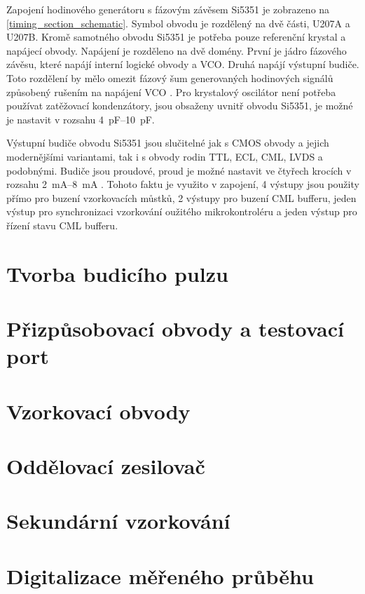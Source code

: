 Zapojení hodinového generátoru s fázovým závěsem Si5351 je zobrazeno na \ref{timing_section_schematic}. Symbol obvodu je rozdělený na dvě části, U207A a U207B. Kromě samotného obvodu Si5351 je potřeba pouze referenční krystal a napájecí obvody. Napájení je rozděleno na dvě domény. První je jádro fázového závěsu, které napájí interní logické obvody a \acrshort{VCO}. Druhá napájí výstupní budiče. Toto rozdělení by mělo omezit fázový šum generovaných hodinových signálů způsobený rušením na napájení \acrshort{VCO} \cite{Si5351applicationnote}. Pro krystalový oscilátor není potřeba používat zatěžovací kondenzátory, jsou obsaženy uvnitř obvodu Si5351, je možné je nastavit v rozsahu \SIrange{4}{10}{\si{pF}}.

Výstupní budiče obvodu Si5351 jsou slučitelné jak s \acrshort{CMOS} obvody a jejich modernějšími variantami, tak i s obvody rodin \acrshort{TTL}, \acrshort{ECL}, \acrshort{CML}, \acrshort{LVDS} a podobnými. Budiče jsou proudové, proud je možné nastavit ve čtyřech krocích v rozsahu \SIrange{2}{8}{\si{mA}} \cite{Si5351datasheet}. Tohoto faktu je využito v zapojení, 4 výstupy jsou použity přímo pro buzení vzorkovacích můstků, 2 výstupy pro buzení \acrshort{CML} bufferu, jeden výstup pro synchronizaci vzorkování oužitého mikrokontroléru a jeden výstup pro řízení stavu \acrshort{CML} bufferu.

\section{Tvorba budicího pulzu}

\section{Přizpůsobovací obvody a testovací port}

\section{Vzorkovací obvody}

\section{Oddělovací zesilovač}

\section{Sekundární vzorkování}

\section{Digitalizace měřeného průběhu}